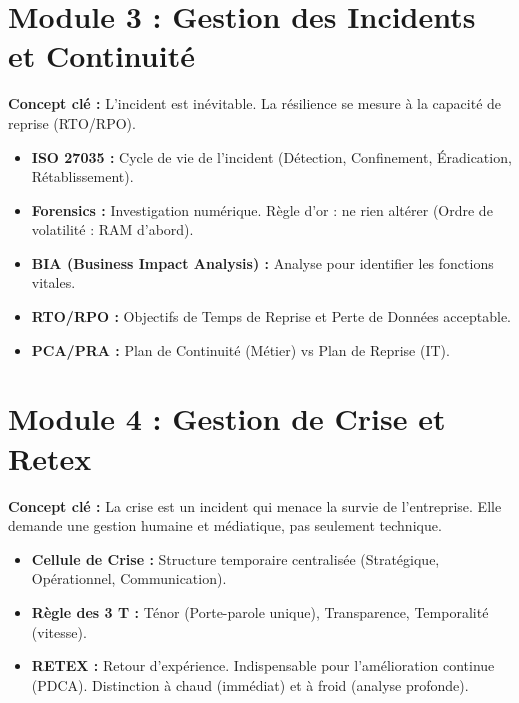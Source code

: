 \section{Module 3 : Gestion des Incidents et Continuité}
\textbf{Concept clé :} L'incident est inévitable. La résilience se mesure à la capacité de reprise (RTO/RPO).
\begin{itemize}
    \item \textbf{ISO 27035 :} Cycle de vie de l'incident (Détection, Confinement, Éradication, Rétablissement).
    \item \textbf{Forensics :} Investigation numérique. Règle d'or : ne rien altérer (Ordre de volatilité : RAM d'abord).
    \item \textbf{BIA (Business Impact Analysis) :} Analyse pour identifier les fonctions vitales.
    \item \textbf{RTO/RPO :} Objectifs de Temps de Reprise et Perte de Données acceptable.
    \item \textbf{PCA/PRA :} Plan de Continuité (Métier) vs Plan de Reprise (IT).
\end{itemize}

\section{Module 4 : Gestion de Crise et Retex}
\textbf{Concept clé :} La crise est un incident qui menace la survie de l'entreprise. Elle demande une gestion humaine et médiatique, pas seulement technique.
\begin{itemize}
    \item \textbf{Cellule de Crise :} Structure temporaire centralisée (Stratégique, Opérationnel, Communication).
    \item \textbf{Règle des 3 T :} Ténor (Porte-parole unique), Transparence, Temporalité (vitesse).
    \item \textbf{RETEX :} Retour d'expérience. Indispensable pour l'amélioration continue (PDCA). Distinction à chaud (immédiat) et à froid (analyse profonde).
\end{itemize}


